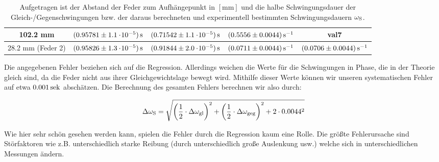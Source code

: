 \begin{table}
{\begin{tabular}{ccccc}
     \hline
    102.2 mm & $\unit[(0.95781 \pm 1.1\e{-5})]{s}$ & $\unit[(0.71542 \pm 1.1\e{-5})]{s}$ & $\unit[(0.5556 \pm 0.0044)]{s^{-1}}$ & val7\\
    \hline
    28.2 mm (Feder 2)  & $\unit[(0.95826 \pm 1.3\e{-5})]{s}$  & $\unit[(0.91844 \pm 2.0\e{-5})]{s}$  & $\unit[(0.0711 \pm 0.0044)]{s^{-1}}$  & $\unit[(0.0706\pm0.0044)]{s^{-1}}$\\
\end{tabular}
}
\caption{Aufgetragen ist der Abstand der Feder zum Aufhängepunkt in $\mathrm{[mm]}$ und die halbe Schwingungsdauer der Gleich-/Gegenschwingungen bzw. der daraus berechneten und experimentell bestimmten Schwingungsdauern $\omega_{\mathrm{S}}$.}
\label{tb:values}
\end{table}

Die angegebenen Fehler beziehen sich auf die Regression. Allerdings weichen die Werte für die Schwingungen in Phase, die in der Theorie gleich sind, da die Feder nicht aus ihrer Gleichgewichtslage bewegt wird. Mithilfe dieser Werte können wir unseren systematischen Fehler auf etwa $\unit[0.001]{sek}$ abschätzen. Die Berechnung des gesamten Fehlers berechnen wir also durch:

\begin{equation*}
\Delta \omega_{\mathrm{S}} = \sqrt{
\left(\frac{1}{2} \cdot \Delta\omega_{\mathrm{gl}}\right)^2
+ 
\left(\frac{1}{2} \cdot \Delta\omega_{\mathrm{geg}}\right)^2
+
2 \cdot 0.0044^2
}
\end{equation*}

Wie hier sehr schön gesehen werden kann, spielen die Fehler durch die Regression kaum eine Rolle. Die größte Fehlerursache sind Störfaktoren wie z.B. unterschiedlich starke Reibung (durch unterschiedlich große Auslenkung usw.) welche sich in unterschiedlichen Messungen ändern.



